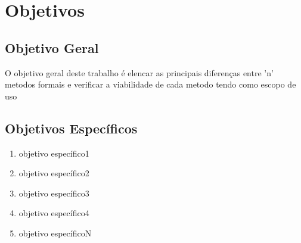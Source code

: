 \section{Objetivos}

\subsection{Objetivo Geral}

O objetivo geral deste trabalho é elencar as principais diferenças entre 'n' metodos formais
e verificar a viabilidade de cada metodo tendo como escopo de uso 

\subsection{Objetivos Específicos}
\begin{enumerate}
    \item objetivo específico1
    \item objetivo específico2
    \item objetivo específico3
    \item objetivo específico4
    \item objetivo específicoN
\end{enumerate}



